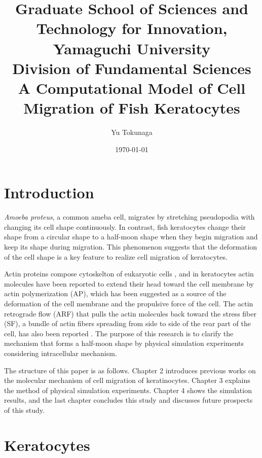\documentclass[a4paper,12pt, oneside]{book}
\title{\Large Graduate School of Sciences and Technology for Innovation, Yamaguchi University\\[1cm]
Division of Fundamental Sciences\\[3cm]
\huge A Computational Model of Cell Migration of Fish Keratocytes\\[5cm]
}
\author{Yu Tokunaga}
\date{\Large \today}
\begin{document}
\maketitle
\setcounter{page}{1}
\tableofcontents
\chapter{Introduction}
\setcounter{page}{1}
{\it Amoeba proteus},  a common ameba cell, migrates by stretching pseudopodia with changing its cell shape continuously.
In contrast, fish keratocytes change their shape from a circular shape to a half-moon shape when they begin migration and keep its shape during migration.
This phenomenon suggests that the deformation of the cell shape is a key feature to realize cell migration of keratocytes.

Actin proteins compose cytoskelton of eukaryotic cells \cite{svitkina1997analysis}, and in keratocytes actin molecules have been reported to extend their head toward the cell membrane by actin polymerization (AP), which has been suggested as a source of the deformation of the cell membrane and the propulsive force of the cell.
The actin retrograde flow (ARF) that pulls the actin molecules back toward the stress fiber (SF), a bundle of actin fibers spreading from side to side of the rear part of the cell, has also been reported \cite{nakashima2015molecular}.
The purpose of this research is to clarify the mechanism that forms a half-moon shape by physical simulation experiments considering intracellular mechanism.

The structure of this paper is as follows.
Chapter 2 introduces previous works on the molecular mechanism of cell migration of keratinocytes.
Chapter 3 explains the  method of physical simulation experiments.
Chapter 4 shows the simulation results, and the last chapter concludes this study and discusses future prospects of this study.

\chapter{Keratocytes}
\end{document}
